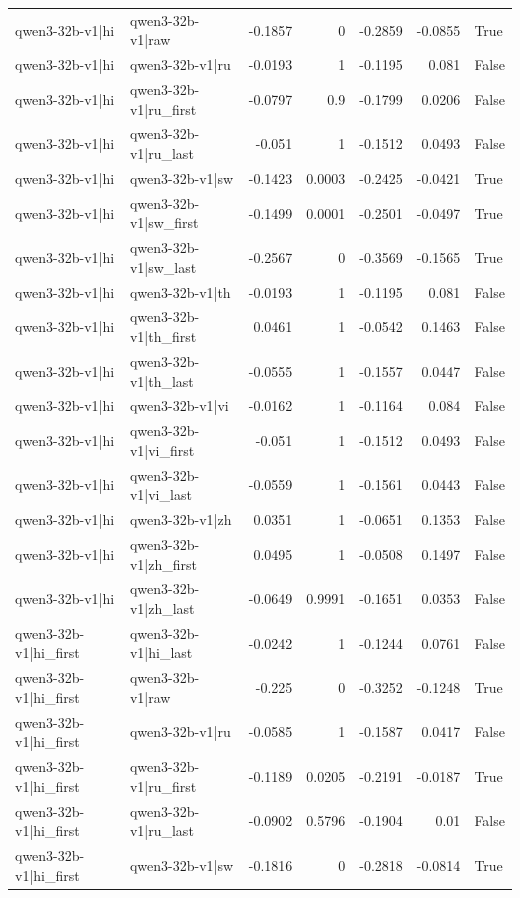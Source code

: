 \begin{table}
\begin{tabular}{l l r r r r l}
qwen3-32b-v1|hi & qwen3-32b-v1|raw & -0.1857 & 0 & -0.2859 & -0.0855 & True \\
qwen3-32b-v1|hi & qwen3-32b-v1|ru & -0.0193 & 1 & -0.1195 & 0.081 & False \\
qwen3-32b-v1|hi & qwen3-32b-v1|ru_first & -0.0797 & 0.9 & -0.1799 & 0.0206 & False \\
qwen3-32b-v1|hi & qwen3-32b-v1|ru_last & -0.051 & 1 & -0.1512 & 0.0493 & False \\
qwen3-32b-v1|hi & qwen3-32b-v1|sw & -0.1423 & 0.0003 & -0.2425 & -0.0421 & True \\
qwen3-32b-v1|hi & qwen3-32b-v1|sw_first & -0.1499 & 0.0001 & -0.2501 & -0.0497 & True \\
qwen3-32b-v1|hi & qwen3-32b-v1|sw_last & -0.2567 & 0 & -0.3569 & -0.1565 & True \\
qwen3-32b-v1|hi & qwen3-32b-v1|th & -0.0193 & 1 & -0.1195 & 0.081 & False \\
qwen3-32b-v1|hi & qwen3-32b-v1|th_first & 0.0461 & 1 & -0.0542 & 0.1463 & False \\
qwen3-32b-v1|hi & qwen3-32b-v1|th_last & -0.0555 & 1 & -0.1557 & 0.0447 & False \\
qwen3-32b-v1|hi & qwen3-32b-v1|vi & -0.0162 & 1 & -0.1164 & 0.084 & False \\
qwen3-32b-v1|hi & qwen3-32b-v1|vi_first & -0.051 & 1 & -0.1512 & 0.0493 & False \\
qwen3-32b-v1|hi & qwen3-32b-v1|vi_last & -0.0559 & 1 & -0.1561 & 0.0443 & False \\
qwen3-32b-v1|hi & qwen3-32b-v1|zh & 0.0351 & 1 & -0.0651 & 0.1353 & False \\
qwen3-32b-v1|hi & qwen3-32b-v1|zh_first & 0.0495 & 1 & -0.0508 & 0.1497 & False \\
qwen3-32b-v1|hi & qwen3-32b-v1|zh_last & -0.0649 & 0.9991 & -0.1651 & 0.0353 & False \\
qwen3-32b-v1|hi_first & qwen3-32b-v1|hi_last & -0.0242 & 1 & -0.1244 & 0.0761 & False \\
qwen3-32b-v1|hi_first & qwen3-32b-v1|raw & -0.225 & 0 & -0.3252 & -0.1248 & True \\
qwen3-32b-v1|hi_first & qwen3-32b-v1|ru & -0.0585 & 1 & -0.1587 & 0.0417 & False \\
qwen3-32b-v1|hi_first & qwen3-32b-v1|ru_first & -0.1189 & 0.0205 & -0.2191 & -0.0187 & True \\
qwen3-32b-v1|hi_first & qwen3-32b-v1|ru_last & -0.0902 & 0.5796 & -0.1904 & 0.01 & False \\
qwen3-32b-v1|hi_first & qwen3-32b-v1|sw & -0.1816 & 0 & -0.2818 & -0.0814 & True \\

\end{tabular}
\end{table}
